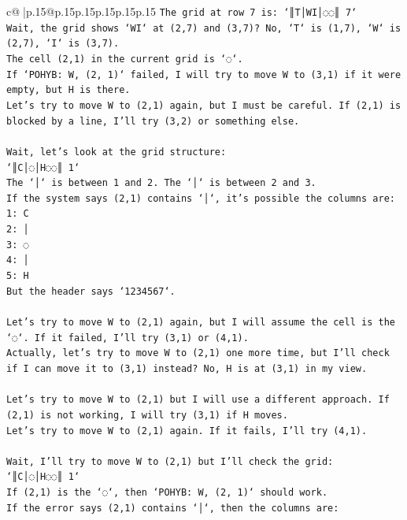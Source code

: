 \documentclass{article}
\begin{document}
{\begin{supertabular}{c@{$\;$}|p{.15\linewidth}@{}p{.15\linewidth}p{.15\linewidth}p{.15\linewidth}p{.15\linewidth}p{.15\linewidth}}
{{{\texttt{The grid at row 7 is: `║T│WI│◌◌║ 7`} \\
\texttt{Wait, the grid shows `WI` at (2,7) and (3,7)? No, `T` is (1,7), `W` is (2,7), `I` is (3,7).} \\
\texttt{The cell (2,1) in the current grid is `◌`.} \\
\texttt{If `POHYB: W, (2, 1)` failed, I will try to move W to (3,1) if it were empty, but H is there.} \\
\texttt{Let's try to move W to (2,1) again, but I must be careful. If (2,1) is blocked by a line, I'll try (3,2) or something else.} \\
\\ 
\texttt{Wait, let's look at the grid structure:} \\
\texttt{`║C│◌│H◌◌║ 1`} \\
\texttt{The `│` is between 1 and 2. The `│` is between 2 and 3.} \\
\texttt{If the system says (2,1) contains `│`, it's possible the columns are:} \\
\texttt{1: C} \\
\texttt{2: │} \\
\texttt{3: ◌} \\
\texttt{4: │} \\
\texttt{5: H} \\
\texttt{But the header says `1234567`.} \\
\\ 
\texttt{Let's try to move W to (2,1) again, but I will assume the cell is the `◌`. If it failed, I'll try (3,1) or (4,1).} \\
\texttt{Actually, let's try to move W to (2,1) one more time, but I'll check if I can move it to (3,1) instead? No, H is at (3,1) in my view.} \\
\\ 
\texttt{Let's try to move W to (2,1) but I will use a different approach. If (2,1) is not working, I will try (3,1) if H moves.} \\
\texttt{Let's try to move W to (2,1) again. If it fails, I'll try (4,1).} \\
\\ 
\texttt{Wait, I'll try to move W to (2,1) but I'll check the grid:} \\
\texttt{`║C│◌│H◌◌║ 1`} \\
\texttt{If (2,1) is the `◌`, then `POHYB: W, (2, 1)` should work.} \\
\texttt{If the error says (2,1) contains `│`, then the columns are:} \\
}}}
\end{supertabular}}
\end{document}
